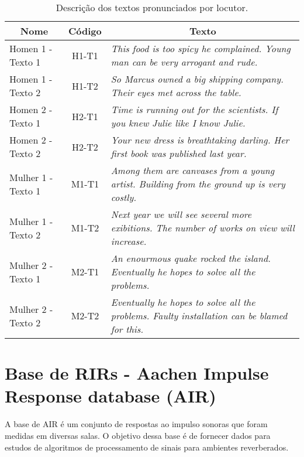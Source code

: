 \begin{table} [H]
    \centering
    \caption{Descrição dos textos pronunciados por locutor.}
    \label{tbl:voice}
    \begin{tabularx}{\textwidth}{l|c|p{9cm}} 
        
        \multicolumn{1}{c|}{\textbf{Nome}} & \multicolumn{1}{|c|}{\textbf{Código}} & \multicolumn{1}{|c}{\textbf{Texto}} \\
        \hline 

        Homen 1 - Texto 1 & H1-T1 & \textit{This food is too spicy he complained. Young man can be very arrogant and rude.} \\
        Homen 1 - Texto 2 & H1-T2 & \textit{So Marcus owned a big shipping company. Their eyes met across the table.} \\
        Homen 2 - Texto 1 & H2-T1 & \textit{Time is running out for the scientists. If you knew Julie like I know Julie.} \\
        Homen 2 - Texto 2 & H2-T2 & \textit{Your new dress is breathtaking darling. Her first book was published last year.} \\
        Mulher 1 - Texto 1 & M1-T1 & \textit{Among them are canvases from a young artist. Building from the ground up is very costly.} \\
        Mulher 1 - Texto 2 & M1-T2 & \textit{Next year we will see several more exibitions. The number of works on view will increase.} \\
        Mulher 2 - Texto 1 & M2-T1 & \textit{An enourmous quake rocked the island. Eventually he hopes to solve all the problems.} \\
        Mulher 2 - Texto 2 & M2-T2 & \textit{Eventually he hopes to solve all the problems. Faulty installation can be blamed for this.} \\
        
    \end{tabularx}
\end{table}

\section{Base de RIRs - Aachen Impulse Response database (AIR)}

A base de AIR \cite{AIR_Database} é um conjunto de respostas ao impulso sonoras que foram medidas em diversas salas.
O objetivo dessa base é de fornecer dados para estudos de algoritmos de processamento de sinais para ambientes reverberados.


